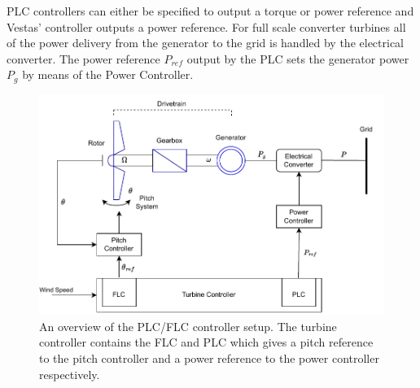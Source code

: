 PLC controllers can either be specified to output a torque or power reference and Vestas' controller outputs a power reference. For full scale converter turbines all of the power delivery from the generator to the grid is handled by the electrical converter. The power reference $ P_{ref} $ output by the PLC sets the generator power $ P_g $ by means of the Power Controller.

\begin{figure}[ht]
	\centering
	\includegraphics[width=0.7\linewidth]{Graphics/PLC_PI.pdf}
	\caption{An overview of the PLC/FLC controller setup. The turbine controller contains the FLC and PLC which gives a pitch reference to the pitch controller and a power reference to the power controller respectively.}
	\label{fig:controller_overview}
\end{figure}

